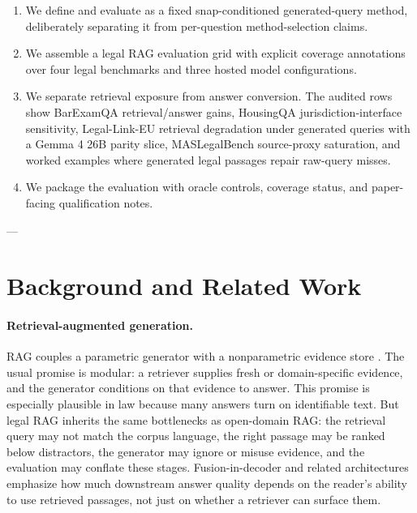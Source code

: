 \begin{enumerate}[leftmargin=*]
\item We define and evaluate \hyre{} as a fixed snap-conditioned
generated-query method, deliberately separating it from per-question
method-selection claims.
\item We assemble a legal RAG evaluation grid with explicit coverage annotations
over four legal benchmarks and three hosted model configurations.
\item We separate retrieval exposure from answer conversion. The audited rows
show BarExamQA retrieval/answer gains, HousingQA jurisdiction-interface
sensitivity, Legal-Link-EU retrieval degradation under generated queries with a
Gemma 4 26B \hyre{} parity slice, MASLegalBench source-proxy saturation, and
worked examples where generated legal passages repair raw-query misses.
\item We package the evaluation with oracle controls, coverage status, and
paper-facing qualification notes.
\end{enumerate}

---

\section{Background and Related Work}\label{sec:preliminary}

\paragraph{Retrieval-augmented generation.}
RAG couples a parametric generator with a nonparametric evidence store
\citep{lewis2020rag}. The usual promise is modular: a retriever supplies
fresh or domain-specific evidence, and the generator conditions on that
evidence to answer. This promise is especially plausible in law because many
answers turn on identifiable text. But legal RAG inherits the same bottlenecks
as open-domain RAG: the retrieval query may not match the corpus
language, the right passage may be ranked below distractors, the generator may
ignore or misuse evidence, and the evaluation may conflate these stages.
Fusion-in-decoder and related architectures \citep{izacard2021fid} emphasize
how much downstream answer quality depends on the reader's ability to use
retrieved passages, not just on whether a retriever can surface them.

